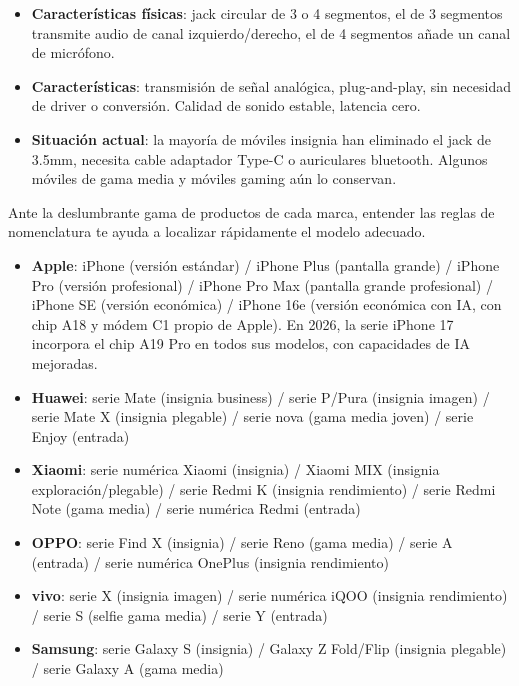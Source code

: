 
\begin{itemize}
  \item \textbf{Características físicas}: jack circular de 3 o 4 segmentos, el de 3 segmentos transmite audio de canal izquierdo/derecho, el de 4 segmentos añade un canal de micrófono.
  \item \textbf{Características}: transmisión de señal analógica, plug-and-play, sin necesidad de driver o conversión. Calidad de sonido estable, latencia cero.
  \item \textbf{Situación actual}: la mayoría de móviles insignia han eliminado el jack de 3.5mm, necesita cable adaptador Type-C o auriculares bluetooth. Algunos móviles de gama media y móviles gaming aún lo conservan.
\end{itemize}


Ante la deslumbrante gama de productos de cada marca, entender las reglas de nomenclatura te ayuda a localizar rápidamente el modelo adecuado.


\begin{itemize}
  \item \textbf{Apple}: iPhone (versión estándar) / iPhone Plus (pantalla grande) / iPhone Pro (versión profesional) / iPhone Pro Max (pantalla grande profesional) / iPhone SE (versión económica) / iPhone 16e (versión económica con IA, con chip A18 y módem C1 propio de Apple). En 2026, la serie iPhone 17 incorpora el chip A19 Pro en todos sus modelos, con capacidades de IA mejoradas.
  \item \textbf{Huawei}: serie Mate (insignia business) / serie P/Pura (insignia imagen) / serie Mate X (insignia plegable) / serie nova (gama media joven) / serie Enjoy (entrada)
  \item \textbf{Xiaomi}: serie numérica Xiaomi (insignia) / Xiaomi MIX (insignia exploración/plegable) / serie Redmi K (insignia rendimiento) / serie Redmi Note (gama media) / serie numérica Redmi (entrada)
  \item \textbf{OPPO}: serie Find X (insignia) / serie Reno (gama media) / serie A (entrada) / serie numérica OnePlus (insignia rendimiento)
  \item \textbf{vivo}: serie X (insignia imagen) / serie numérica iQOO (insignia rendimiento) / serie S (selfie gama media) / serie Y (entrada)
  \item \textbf{Samsung}: serie Galaxy S (insignia) / Galaxy Z Fold/Flip (insignia plegable) / serie Galaxy A (gama media)
\end{itemize}

